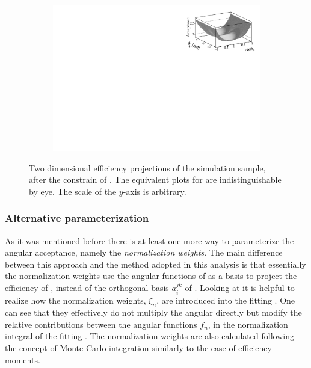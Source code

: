 \begin{figure}[h]
\begin{subfigure}{0.5\textwidth}
    \includegraphics[width=\textwidth]{Figures/Chapter4/canv_cosThL_phi_Sim08_3fb_hel_negKaons_all.pdf}
    \caption{}
    \label{eff2D_lp}
  \end{subfigure}
\caption{Two dimensional efficiency projections of the \BsJpsiKst simulation sample, after the constrain of .
         The equivalent plots for \BsbarJpsiKst are indistinguishable by eye. The scale of the $y$-axis is arbitrary.}
    \label{eff2D}
\end{figure}

\subsubsection{Alternative parameterization}
As it was mentioned before there is at least one more way to parameterize the angular acceptance, namely the \emph{normalization weights}.
The main difference between this approach and the method adopted in this analysis is that essentially the normalization weights use the angular functions
of  as a basis to project the efficiency of , instead of the orthogonal basis $a_i^{jk}$ of .
Looking at  it is helpful to realize how the normalization weights, $\xi_n$, are introduced into the fitting \pdf.
One can see that they effectively do not multiply the angular \pdf directly but modify the relative contributions between the angular functions
$f_n$, in the normalization integral of the fitting \pdf. The normalization weights are also calculated following the concept of Monte Carlo integration
similarly to the case of efficiency moments.

